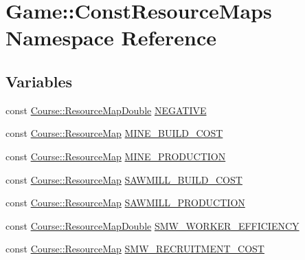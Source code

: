 \hypertarget{namespaceGame_1_1ConstResourceMaps}{\section{Game\-:\-:Const\-Resource\-Maps Namespace Reference}
\label{namespaceGame_1_1ConstResourceMaps}
}
\subsection*{Variables}
\begin{DoxyCompactItemize}
\item 
const \hyperlink{namespaceCourse_a0b96bae1a664dde34efbb1b42dea615e}{Course\-::\-Resource\-Map\-Double} \hyperlink{namespaceGame_1_1ConstResourceMaps_a47a3f289ff3f23e3c884335f8eaa067d}{N\-E\-G\-A\-T\-I\-V\-E}
\item 
const \hyperlink{namespaceCourse_ab9a46ed9cd00485e318e5731ea2f78d9}{Course\-::\-Resource\-Map} \hyperlink{namespaceGame_1_1ConstResourceMaps_adda0aad5b2188a57d2d187f692e2c2f9}{M\-I\-N\-E\-\_\-\-B\-U\-I\-L\-D\-\_\-\-C\-O\-S\-T}
\item 
const \hyperlink{namespaceCourse_ab9a46ed9cd00485e318e5731ea2f78d9}{Course\-::\-Resource\-Map} \hyperlink{namespaceGame_1_1ConstResourceMaps_ad58736a7028bf9bdd46583af4cb3d410}{M\-I\-N\-E\-\_\-\-P\-R\-O\-D\-U\-C\-T\-I\-O\-N}
\item 
const \hyperlink{namespaceCourse_ab9a46ed9cd00485e318e5731ea2f78d9}{Course\-::\-Resource\-Map} \hyperlink{namespaceGame_1_1ConstResourceMaps_a8101879b3f9a231535e629475969da07}{S\-A\-W\-M\-I\-L\-L\-\_\-\-B\-U\-I\-L\-D\-\_\-\-C\-O\-S\-T}
\item 
const \hyperlink{namespaceCourse_ab9a46ed9cd00485e318e5731ea2f78d9}{Course\-::\-Resource\-Map} \hyperlink{namespaceGame_1_1ConstResourceMaps_a1302532b63eb3d623779fb539dd767e8}{S\-A\-W\-M\-I\-L\-L\-\_\-\-P\-R\-O\-D\-U\-C\-T\-I\-O\-N}
\item 
const \hyperlink{namespaceCourse_a0b96bae1a664dde34efbb1b42dea615e}{Course\-::\-Resource\-Map\-Double} \hyperlink{namespaceGame_1_1ConstResourceMaps_aa229959dcf7750d06878db7f5c4d0bae}{S\-M\-W\-\_\-\-W\-O\-R\-K\-E\-R\-\_\-\-E\-F\-F\-I\-C\-I\-E\-N\-C\-Y}
\item 
const \hyperlink{namespaceCourse_ab9a46ed9cd00485e318e5731ea2f78d9}{Course\-::\-Resource\-Map} \hyperlink{namespaceGame_1_1ConstResourceMaps_aece4521104576e9af5ab8635b786c840}{S\-M\-W\-\_\-\-R\-E\-C\-R\-U\-I\-T\-M\-E\-N\-T\-\_\-\-C\-O\-S\-T}
\item 

\end{DoxyCompactItemize}
